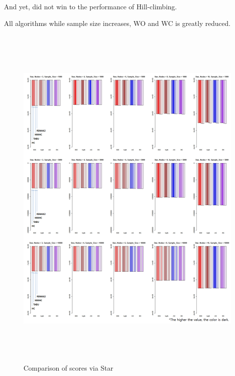 And yet, did not win to the performance of Hill-climbing.

All algorithms while sample size increases, WO and WC is greatly reduced.
	
	\begin{figure}[p]
	\centering
		\includegraphics[height=500pt]{images/03_Star_Score}
		\caption{Comparison of scores via Star}
	\end{figure}	

